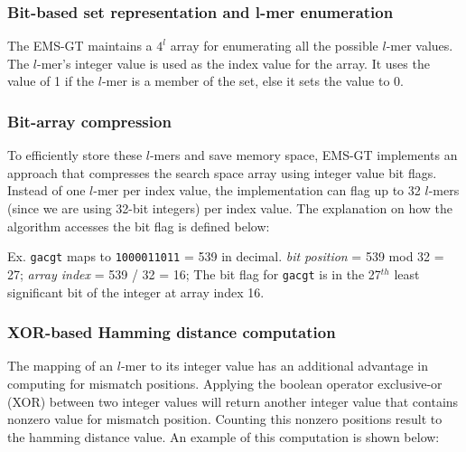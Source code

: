 	\subsubsection{Bit-based set representation and l-mer enumeration} 
	The EMS-GT maintains a $4^l$ array for enumerating all the possible $l$-mer values. The $l$-mer's integer value is used as the index value for the array. It uses the value of 1 if the $l$-mer is a member of the set, else it sets the value to 0.

	\subsubsection{Bit-array compression}
	To efficiently store these $l$-mers and save memory space, EMS-GT implements an approach that compresses the search space array using integer value bit flags. Instead of one $l$-mer per index value, the implementation can flag up to 32 $l$-mers (since we are using 32-bit integers) per index value. The explanation on how the algorithm accesses the bit flag is defined below: \newline

		{\small Ex. \texttt{gacgt} maps to \texttt{1000011011} = 539 in decimal.\newline
			\hspace*{64pt} \emph{bit position} = 539 mod 32 = 27;\newline
			\hspace*{64pt} \emph{array index}  = 539 / 32 = 16;\newline
			\hspace*{64pt} The bit flag for \texttt{gacgt} is in the 27$^{th}$ least significant bit\newline
			\hspace*{64pt} of the integer at array index 16.}

	

	\subsubsection{XOR-based Hamming distance computation}
	The mapping of an $l$-mer to its integer value has an additional advantage in computing for mismatch positions. Applying the boolean operator exclusive-or (XOR) between two integer values will return another integer value that contains nonzero value for mismatch position. Counting this nonzero positions result to the hamming distance value. An example of this computation is shown below: \newline

